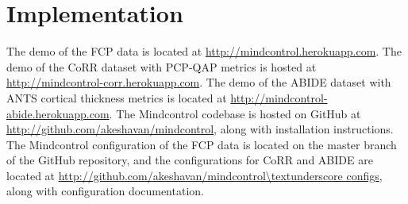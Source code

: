 \section{Implementation}

The demo of the FCP data is located at \url{http://mindcontrol.herokuapp.com}. The demo of the CoRR dataset with PCP-QAP metrics is hosted at \url{http://mindcontrol-corr.herokuapp.com}. The demo of the ABIDE dataset with ANTS cortical thickness metrics is located at \url{http://mindcontrol-abide.herokuapp.com}. The Mindcontrol codebase is hosted on GitHub at \url{http://github.com/akeshavan/mindcontrol}, along with installation instructions. The Mindcontrol configuration of the FCP data is located on the master branch of the GitHub repository, and the configurations for CoRR and ABIDE are located at \url{http://github.com/akeshavan/mindcontrol\textunderscore configs}, along with configuration documentation. 

